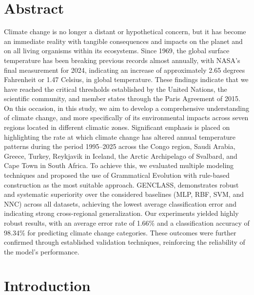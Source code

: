 \documentclass[12pt]{Definitions/academia}
\begin{document}
\section*{Abstract}
Climate change is no longer a distant or hypothetical concern, but
it has become an immediate reality with tangible consequences and
impacts on  the planet and on all living organisms within its ecosystems.
Since 1969, the global surface temperature has been breaking previous
records almost annually, with NASA\textquoteright s final measurement
for 2024, indicating an increase of approximately 2.65  degrees Fahrenheit
or 1.47 Celsius, in global temperature. These findings indicate that
we have reached the critical thresholds established by the United
Nations, the scientific community, and member states through the Paris
Agreement of 2015. On this occasion, in this study, we aim to develop
a comprehensive understanding of climate change, and more specifically
of its environmental impacts across seven regions located in different
climatic zones. Significant emphasis is placed on highlighting the
rate at which climate change has altered annual temperature patterns
during the period 1995--2025 across the Congo region, Saudi Arabia, Greece,
Turkey, Reykjavik in Iceland, the Arctic Archipelago of Svalbard,
and Cape Town in South Africa. To achieve this, we evaluated multiple
modeling techniques and proposed the use of Grammatical Evolution
with rule-based construction as the most suitable approach. GENCLASS,
demonstrates robust and systematic superiority over the considered
baselines (MLP, RBF, SVM, and NNC) across all datasets, achieving
the lowest average classification error and indicating strong cross-regional
generalization. Our experiments yielded highly robust results, with
an average error rate of 1.66\% and a classification accuracy of 98.34\%
for predicting climate change categories. These outcomes were further
confirmed through established validation techniques, reinforcing the
reliability of the model\textquoteright s performance.


\section{Introduction}\label{sec1}
\end{document}
